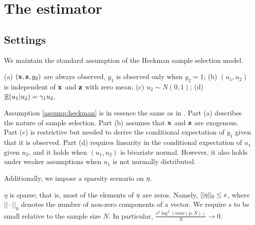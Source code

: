 \documentclass[11pt]{article}
\begin{document}
		
\section{The {\dsheck} estimator}\label{sec:model}

	\subsection{Settings}

We maintain the standard assumption of the Heckman sample selection
model.

\begin{assumption} \label{assump:heckman}
(a) $(\mathbf{x}, \mathbf{z}, y_2)$ are always observed, $y_1$ is observed only
when $y_2 =1$;
(b) $(u_1, u_2)$ is independent of $\mathbf{x}$ and $\mathbf{z}$ with zero mean;
(c) $u_2 \sim N(0, 1)$;
(d) $\mathop{\mathbb{E}}(u_1 | u_2) = \gamma_1 u_2$.
\end{assumption}

Assumption \ref{assump:heckman} is in essence the same as in
\citet[][p.~803]{wooldridge2010}. Part (a) describes the nature of sample
selection. Part (b) assumes that $\mathbf{x}$ and $\mathbf{z}$ are exogenous. Part
(c) is restrictive but needed to derive the conditional expectation of
$y_1$ given that it is observed. Part (d) requires linearity in the conditional
expectation of $u_1$ given $u_2$, and it holds when $(u_1, u_2)$ is bivariate normal. However, it also holds under weaker assumptions
when $u_1$ is not normally distributed.

Additionally, we impose a sparsity scenario on $\mathbf{\eta}$. %

\begin{assumption} \label{assump:sparsity}
$\eta$ is sparse; that is, most of the elements of $\mathbf{\eta}$ are zeros. Namely, $||\mathbf{\eta}||_0 \leq
s$, where $||\cdot||_0$ denotes the number of non-zero components of a vector. We require $s$ to be small relative to the sample size $N$. In particular, 
$\frac{s^2\log^2(max(p , N))}{N} \longrightarrow 0$.
\end{assumption}
\end{document}
